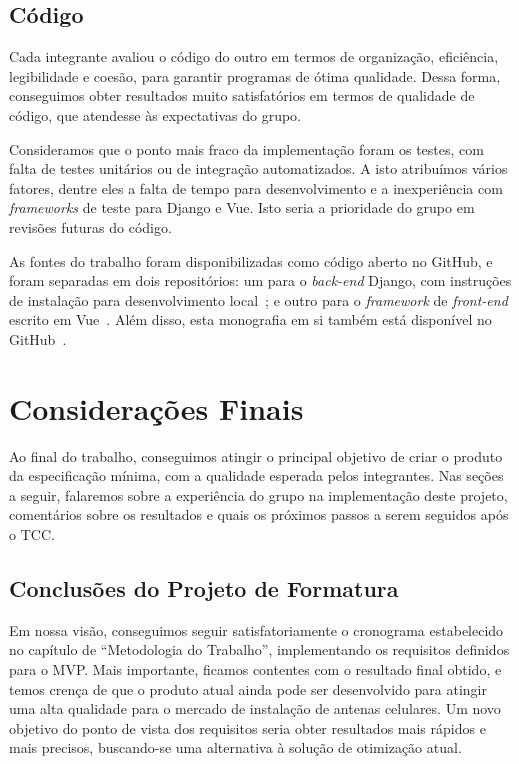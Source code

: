 \documentclass[]{politex}
\begin{document}
\section{Código}

Cada integrante avaliou o código do outro em termos de organização, eficiência,
legibilidade e coesão, para garantir programas de ótima qualidade. Dessa forma,
conseguimos obter resultados muito satisfatórios em termos de qualidade de
código, que atendesse às expectativas do grupo.

Consideramos que o ponto mais fraco da implementação foram os testes, com falta
de testes unitários ou de integração automatizados. A isto atribuímos vários
fatores, dentre eles a falta de tempo para desenvolvimento e a inexperiência
com \textit{frameworks} de teste para Django e Vue. Isto seria a prioridade
do grupo em revisões futuras do código.

As fontes do trabalho foram disponibilizadas como código aberto no GitHub, e
foram separadas em dois repositórios: um para o \textit{back-end} Django, com
instruções de instalação para desenvolvimento local~\cite{repo-django}; e outro
para o \textit{framework} de \textit{front-end} escrito em Vue~\cite{repo-vue}.
Além disso, esta monografia em si também está disponível no GitHub~\cite{repo-tcc}.

\chapter{Considerações Finais}

Ao final do trabalho, conseguimos atingir o principal objetivo de criar o
produto da especificação mínima, com a qualidade esperada pelos integrantes.
Nas seções a seguir, falaremos sobre a experiência do grupo na implementação
deste projeto, comentários sobre os resultados e quais os próximos passos a
serem seguidos após o TCC.

\section{Conclusões do Projeto de Formatura}

Em nossa visão, conseguimos seguir satisfatoriamente o cronograma estabelecido
no capítulo de ``Metodologia do Trabalho'', implementando os requisitos
definidos para o MVP. Mais importante, ficamos contentes com o resultado final
obtido, e temos crença de que o produto atual ainda pode ser desenvolvido para
atingir uma alta qualidade para o mercado de instalação de antenas celulares.
Um novo objetivo do ponto de vista dos requisitos seria obter resultados mais
rápidos e mais precisos, buscando-se uma alternativa à solução de otimização
atual.
\end{document}
